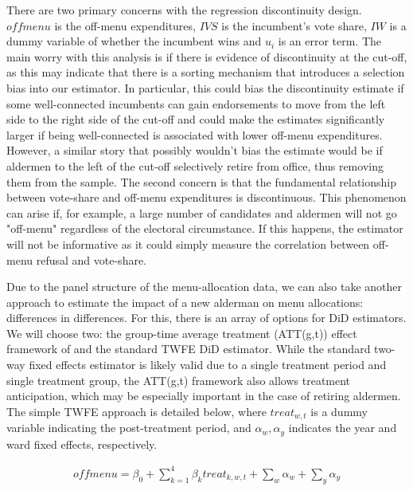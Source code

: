  There are two primary concerns with the regression discontinuity design. 
 $offmenu$ is the off-menu expenditures, $IVS$ is the incumbent's vote share, $IW$ is a dummy variable of whether the incumbent wins and $u_i$ is an error term. 
 The main worry with this analysis is if there is evidence of discontinuity at the cut-off, as this may indicate that there is a sorting mechanism that introduces a selection bias into our estimator. 
 In particular, this could bias the discontinuity estimate if some well-connected incumbents can gain endorsements to move from the left side to the right side of the cut-off and could make the estimates significantly larger if being well-connected is associated with lower off-menu expenditures. 
 However, a similar story that possibly wouldn't bias the estimate would be if aldermen to the left of the cut-off selectively retire from office, thus removing them from the sample. 
 The second concern is that the fundamental relationship between vote-share and off-menu expenditures is discontinuous. 
 This phenomenon can arise if, for example, a large number of candidates and aldermen will not go "off-menu" regardless of the electoral circumstance. 
 If this happens, the estimator will not be informative as it could simply measure the correlation between off-menu refusal and vote-share.


Due to the panel structure of the menu-allocation data, we can also take another approach to estimate the impact of a new alderman on menu allocations: differences in differences. 
For this, there is an array of options for DiD estimators. 
We will choose two: the group-time average treatment (ATT(g,t)) effect framework of \cite{CALLAWAY2021200} and the standard TWFE DiD estimator. 
While the standard two-way fixed effects estimator is likely valid due to a single treatment period and single treatment group, the ATT(g,t) framework also allows treatment anticipation, which may be especially important in the case of retiring aldermen. 
The simple TWFE approach is detailed below, where $treat_{w,t}$ is a dummy variable indicating the post-treatment period, and $\alpha_w, \alpha_y$ indicates the year and ward fixed effects, respectively. 

\begin{align*}
    offmenu=\beta_0 + \sum_{k=1}^4 \beta_k treat_{k,w,t} + \sum_w \alpha_w + \sum_y \alpha_y
\end{align*}

